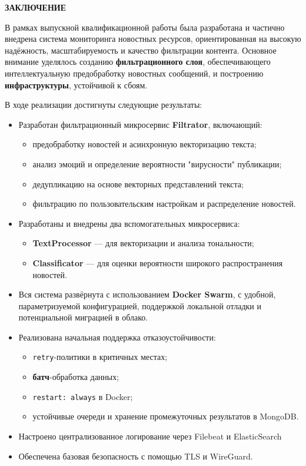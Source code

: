 \newpage
{\centering
\normal
\textbf{ЗАКЛЮЧЕНИЕ}\par
}

В рамках выпускной квалификационной работы была разработана и частично внедрена система мониторинга новостных ресурсов, ориентированная на высокую надёжность, масштабируемость и качество фильтрации контента.
Основное внимание уделялось созданию \textbf{фильтрационного слоя}, обеспечивающего интеллектуальную предобработку новостных сообщений, и построению \textbf{инфраструктуры}, устойчивой к сбоям.

В ходе реализации достигнуты следующие результаты:
\begin{itemize}
  \item Разработан фильтрационный микросервис \textbf{Filtrator}, включающий:
  \begin{itemize}
    \item предобработку новостей и асинхронную векторизацию текста;
    \item анализ эмоций и определение вероятности "вирусности" публикации;
    \item дедупликацию на основе векторных представлений текста;
    \item фильтрацию по пользовательским настройкам и распределение новостей.
  \end{itemize}
  \item Разработаны и внедрены два вспомогательных микросервиса:
  \begin{itemize}
    \item \textbf{TextProcessor} — для векторизации и анализа тональности;
    \item \textbf{Classificator} — для оценки вероятности широкого распространения новостей.
  \end{itemize}
  \item Вся система развёрнута с использованием \textbf{Docker Swarm}, с удобной, параметризуемой конфигурацией, поддержкой локальной отладки и потенциальной миграцией в облако.
  \item Реализована начальная поддержка отказоустойчивости:
  \begin{itemize}
    \item \texttt{retry}-политики в критичных местах;
    \item \textbf{батч}-обработка данных;
    \item \texttt{restart: always} в Docker;
    \item устойчивые очереди и хранение промежуточных результатов в MongoDB.
  \end{itemize}
  \item Настроено централизованное логирование через Filebeat и ElasticSearch
  \item Обеспечена базовая безопасность с помощью TLS и WireGuard.
\end{itemize}

